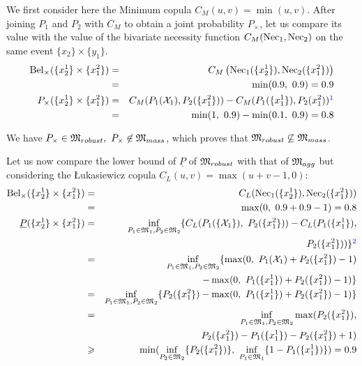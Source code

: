 \begin{example}
    
    We first consider here the Minimum copula $C_M(u,v)=\min(u,v)$. After joining $P_1$ and $P_2$ with $C_M$ to obtain a joint probability $P_\times$, let us compare its value with the value of the bivariate necessity function $C_M(\mathrm{Nec}_1, \mathrm{Nec}_2)$ on the same event $\{x_2\}\times\{y_1\}$.
    \begin{eqnarray*}
        \Bel_\times(\{x^1_2\}\times\{x^2_1\}) &=& C_M\left(\Nec_1(\{x^1_2\}), \Nec_2(\{x^2_1\})\right)\\
        &=& \min(0.9,~0.9) = 0.9\\
        P_\times(\{x^1_2\}\times\{x^2_1\}) &=& C_M(P_1(\X_1), P_2(\{x^2_1\})) - C_M(P_1(\{x^1_1\}),P_2(x^2_1))\commanue{je vois pas de quelle précédente formule sort le calcul}\\
        &=& \min(1,~0.9) - \min(0.1,~0.9) = 0.8
    \end{eqnarray*}
    
    We have $P_\times\in\mathfrak{M}_{robust}, ~P_\times\not\in\mathfrak{M}_{mass}$, which proves that $\mathfrak{M}_{robust}\not\subseteq\mathfrak{M}_{mass}$.
    
    Let us now compare the lower bound of $\underline{P}$ of $\mathfrak{M}_{robust}$ with that of $\mathfrak{M}_{agg}$ but considering the \L ukasiewicz copula $C_L(u,v)=\max(u+v-1,0)$:
    \begin{eqnarray*}
        \Bel_\times(\{x^1_2\}\times\{x^2_1\}) &=& C_L(\Nec_1(\{x^1_2\}), \Nec_2(\{x^2_1\}))\\
        &=& \max(0,~0.9 + 0.9 - 1) = 0.8\\
        \low(\{x^1_2\}\times\{x^2_1\}) &=& \inf_{P_1\in\M_1, P_2\in\M_2}\{C_L(P_1(\{\X_1\}),~P_2(\{x^2_1\})) - C_L(P_1(\{x^1_1\}),\\
        && P_2(\{x^2_1\}))\}\commanue{une petite aide pour retrouver la formule utilisée}\\
        &=& \inf_{P_1\in\M_1, P_2\in\M_2}\{\max(0,~P_1(\X_1) + P_2(\{x^2_1\}) - 1)\\
        && - \max(0,~P_1(\{x^1_1\}) + P_2(\{x^2_1\}) -1)\}\\
        &=& \inf_{P_1\in\M_1, P_2\in\M_2}\{P_2(\{x^2_1\}) - \max(0,~P_1(\{x^1_1\}) + P_2(\{x^2_1\}) - 1 )\}\\
        &=& \inf_{P_1\in\M_1, P_2\in\M_2}\max(P_2(\{x^2_1\}),\\
        && P_2(\{x^2_1\})-P_1(\{x^1_1\}) - P_2(\{x^2_1\}) + 1 )\\
        &\geqslant& \min(\inf_{P_2\in\M_2}\{P_2(\{x^2_1\})\},~\inf_{P_1\in\M_1}\{1-P_1(\{x^1_1\})\}) = 0.9
    \end{eqnarray*}
    

\end{example}
